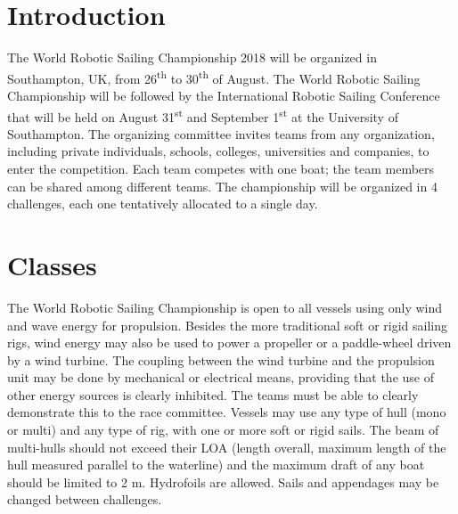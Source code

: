 \documentclass[12pt]{article}
\begin{document}
\maketitle

\section{Introduction}

The World Robotic Sailing Championship 2018 will be organized in Southampton,
UK, from 26\textsuperscript{th} to 30\textsuperscript{th} of August.
The World Robotic Sailing Championship will be followed by
the International Robotic Sailing Conference that will be held on August
31\textsuperscript{st} and September 1\textsuperscript{st} at the University of
Southampton.
The organizing committee invites teams from any organization, including private
individuals, schools, colleges, universities and companies, to enter the competition. 
Each team competes with one boat; the team members can be shared among different teams. 
The championship will be organized in 4 challenges, each one tentatively allocated to a single day.

\section{Classes}

The World Robotic Sailing Championship is open to all vessels using 
only wind and wave energy for propulsion. 
Besides the more traditional soft or rigid sailing rigs, wind energy may also 
be used to power a propeller or a paddle-wheel driven by a wind turbine. 
The coupling between the wind turbine and the propulsion unit may be done by 
mechanical or electrical means, providing that the use of other energy sources
is clearly inhibited. The teams must be able to clearly demonstrate 
this to the race committee.
Vessels may use any type of hull (mono or multi) and any type of rig, with
one or more soft or rigid sails. The beam of multi-hulls should not exceed their 
LOA (length overall, maximum length of the hull measured parallel to the waterline) 
and the maximum draft of any boat should be limited to 2 m. 
Hydrofoils are allowed. Sails and appendages may be changed between challenges.
\end{document}
